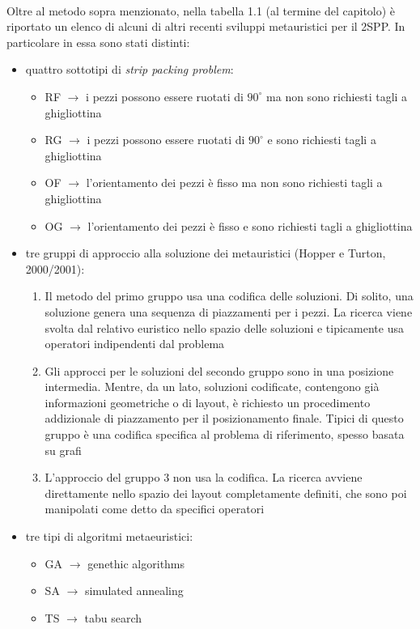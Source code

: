 \documentclass[12pt,a4paper,openright,twoside]{report}
\begin{document}
\\Oltre al metodo sopra menzionato, nella tabella 1.1 (al termine del capitolo) \`{e} riportato un elenco di alcuni di altri recenti sviluppi metauristici per il 2SPP.  In particolare in essa sono stati distinti:
\begin{itemize}
\item quattro sottotipi di \textit{strip packing problem}:
\begin{itemize}
\item RF $\rightarrow$ i pezzi possono essere ruotati di $90^{\circ}$ ma non sono richiesti tagli a ghigliottina
\item RG $\rightarrow$ i pezzi possono essere ruotati di $90^{\circ}$ e sono richiesti tagli a ghigliottina
\item OF $\rightarrow$ l'orientamento dei pezzi \`{e} fisso ma non sono richiesti tagli a ghigliottina
\item OG $\rightarrow$ l'orientamento dei pezzi \`{e} fisso e sono richiesti tagli a ghigliottina
\end{itemize}
\item tre gruppi di approccio alla soluzione dei metauristici (Hopper e Turton, 2000/2001):
\begin{enumerate}
\item Il metodo del primo gruppo usa una codifica delle soluzioni. Di solito, una soluzione genera una sequenza di piazzamenti per i pezzi. La ricerca viene svolta dal relativo euristico nello spazio delle soluzioni e tipicamente usa operatori indipendenti dal problema
\item Gli approcci per le soluzioni del secondo gruppo sono in una posizione intermedia. Mentre, da un lato, soluzioni codificate, contengono gi\`{a} informazioni geometriche o di layout, \`{e} richiesto un procedimento addizionale di piazzamento per il posizionamento finale. Tipici di questo gruppo \`{e} una codifica specifica al problema di riferimento, spesso basata su grafi
\item L'approccio del gruppo $3$ non usa la codifica. La ricerca avviene direttamente nello spazio dei layout completamente definiti, che sono poi manipolati come detto da specifici operatori
\end{enumerate}
\item tre tipi di algoritmi metaeuristici:
\begin{itemize}
\item GA $\rightarrow$ genethic algorithms
\item SA $\rightarrow$ simulated annealing
\item TS $\rightarrow$ tabu search
\end{itemize}
\end{itemize}
\end{document}
